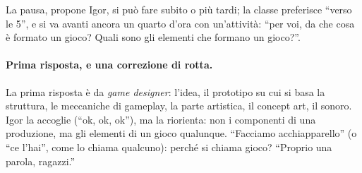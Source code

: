 La pausa, propone Igor, si può fare subito o più tardi; la classe preferisce ``verso le
5'', e si va avanti ancora un quarto d'ora con un'attività: ``per voi, da che cosa è
formato un gioco? Quali sono gli elementi che formano un gioco?''.

\paragraph{Prima risposta, e una correzione di rotta.} La prima risposta è da
\emph{game designer}: l'idea, il prototipo su cui si basa la struttura, le meccaniche
di gameplay, la parte artistica, il concept art, il sonoro. Igor la accoglie (``ok, ok,
ok''), ma la riorienta: non i componenti di una produzione, ma gli elementi di un gioco
qualunque. ``Facciamo acchiapparello'' (o ``ce l'hai'', come lo chiama qualcuno):
perché si chiama gioco? ``Proprio una parola, ragazzi.''

